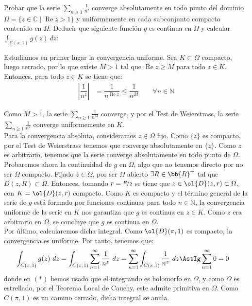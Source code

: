\documentclass[12pt]{article}
\renewcommand{\Re}{\operatorname{Re}} %
\begin{document}
    \newpage
    \setcounter{ejercicio}{0}

    \begin{ejercicio}[4 puntos]
        Probar que la serie $\displaystyle \sum_{n\geq 1} \frac{1}{n^z}$ converge absolutamente en todo punto del dominio $\Omega = \{ z \in \mathbb{C} \mid \Re z > 1 \}$ y uniformemente en cada subconjunto compacto contenido en $\Omega$. Deducir que siguiente función $g$ es continua en $\Omega$ y calcular $\displaystyle \int_{C(\pi,1)} g(z) \ dz$:

        Estudiamos en primer lugar la convergencia uniforme. Sea $K\subset \Omega$ compacto, luego cerrado, por lo que existe $M>1$ tal que $\Re z \geq M$ para todo $z\in K$. Entonces, para todo $z\in K$ se tiene que:
        \begin{align*}
            \left|\dfrac{1}{n^z}\right| &= \dfrac{1}{n^{\Re z}} \leq \dfrac{1}{n^M} \qquad \forall n\in \mathbb{N}
        \end{align*}

        Como $M> 1$, la serie $\displaystyle \sum_{n\geq 1} \frac{1}{n^M}$ converge, y por el Test de Weierstrass, la serie $\displaystyle \sum_{n\geq 1} \frac{1}{n^z}$ converge uniformemente en $K$.\\

        Para la convergencia absoluta, consideramos $z\in \Omega$ fijo. Como $\{z\}$ es compacto, por el Test de Weierstrass tenemos que converge absolutamente en $\{z\}$. Como $z$ es arbitrario, tenemos que la serie converge absolutamente en todo punto de $\Omega$.\\
        
        Probaremos ahora la continuidad de $g$ en $\Omega$, algo que no tenemos directo por no ser $\Omega$ compacto. Fijado $z\in \Omega$, por ser $\Omega$ abierto $\exists R\in \bb{R}^+$ tal que $D(z,R)\subset \Omega$. Entonces, tomando $r=\nicefrac{R}{2}$ se tiene que $z\in \ol{D}(z,r)\subset \Omega$, con $K=\ol{D}(z,r)$ compacto. Como $K$ es compacto y el término general de la serie de $g$ está formado por funciones continuas para todo $n\in \mathbb{N}$, la convergencia uniforme de la serie en $K$ nos garantiza que $g$ es continua en $z\in K$. Como $z$ era arbitrario en $\Omega$, se concluye que $g$ es continua en $\Omega$.\\

        Por último, calcularemos dicha integral. Como $\ol{D}(\pi,1)$ es compacto, la convergencia es uniforme. Por tanto, tenemos que:
        \begin{align*}
            \int_{C(\pi,1)} g(z) \ dz &= \int_{C(\pi,1)} \sum_{n=1}^{\infty} \frac{1}{n^z} \ dz = \sum_{n=1}^{\infty} \int_{C(\pi,1)} \frac{1}{n^z} \ dz \AstIg \sum_{n=1}^{\infty} 0 = 0
        \end{align*}
        donde en $(\ast)$ hemos usado que el integrando es holomorfo en $\Omega$, y como $\Omega$ es estrellado, por el Teorema Local de Cauchy, este admite primitiva en $\Omega$. Como $C(\pi,1)$ es un camino cerrado, dicha integral se anula.
    \end{ejercicio}
\end{document}
